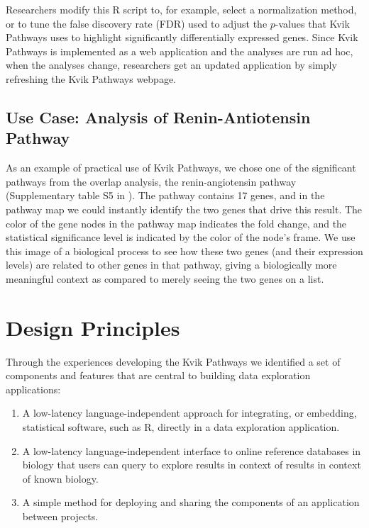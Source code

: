Researchers modify this R script to, for example, select a normalization method,
or to tune the false discovery rate (FDR) used to adjust the $p$-values that
Kvik Pathways uses to highlight significantly differentially expressed genes.
Since Kvik Pathways is implemented as a web application and the analyses are run
ad hoc, when the analyses change, researchers get an updated application by
simply refreshing the Kvik Pathways webpage.

\subsection{Use Case: Analysis of Renin-Antiotensin Pathway}
As an example of practical use of Kvik Pathways, we chose one of the
significant pathways from the overlap analysis, the renin-angiotensin
pathway (Supplementary table S5 in \cite{olsen2013plasma}). The pathway
contains 17 genes, and in the pathway map we could instantly identify the
two genes that drive this result. The color of the gene nodes in the pathway
map indicates the fold change, and the statistical significance level is
indicated by the color of the node's frame.  We use this image of a
biological process to see how these two genes (and their expression levels)
are related to other genes in that pathway, giving a biologically more
meaningful context as compared to merely seeing the two genes on a list.

\section{Design Principles}\label{challengeref} 
Through the experiences developing the Kvik Pathways we identified a set of
components and features that are central to building data exploration
applications: 

\begin{enumerate}
    \item A low-latency language-independent approach for integrating, or
        embedding, statistical software, such as R, directly in a data
        exploration application. 
    \item A low-latency language-independent interface to online reference
        databases in biology that users can query to explore results in context
        of results in context of known biology. 
    \item A simple method for deploying and sharing the components of an
        application between projects. 
\end{enumerate} 


